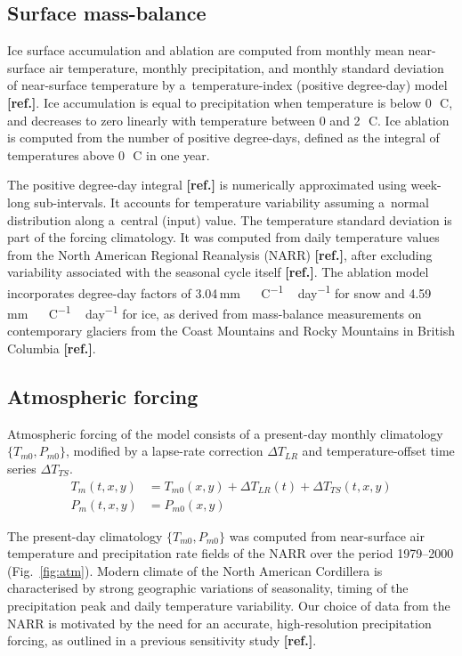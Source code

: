 \documentclass[tc, manuscript]{copernicus}
\newcommand{\aref}[0]{\textbf{[ref.]}}
\renewcommand{\citep}[1]{\aref}
\renewcommand{\citet}[1]{\aref}
\begin{document}
\subsection{Surface mass-balance}

Ice surface accumulation and ablation are computed from monthly mean
near-surface air temperature, monthly precipitation, and monthly standard
deviation of near-surface temperature by a~temperature-index (positive
degree-day) model \citep{hock-2003}. Ice accumulation is equal to precipitation
when temperature is below 0\,\unit{{\degree}C}, and decreases to zero linearly
with temperature between 0 and 2\,\unit{{\degree}C}. Ice ablation is computed
from the number of positive degree-days, defined as the integral of
temperatures above 0\,\unit{{\degree}C} in one year.

The positive degree-day integral \citep{calov-greve-2005} is numerically
approximated using week-long sub-intervals. It accounts for temperature
variability assuming a~normal distribution along a~central (input) value. The
temperature standard deviation is part of the forcing climatology. It was
computed from daily temperature values from the North American Regional
Reanalysis (NARR) \citep{data:narr}, after excluding variability associated
with the
seasonal cycle itself \citet{seguinot-rogozhina-2014}. The
ablation model incorporates degree-day factors of
3.04\,\unit{mm\,{\degree}C^{-1}\,day^{-1}} for snow and
4.59\,\unit{mm\,{\degree}C^{-1}\,day^{-1}} for ice, as derived from
mass-balance measurements on contemporary glaciers from the Coast Mountains and
Rocky Mountains in British Columbia \citep{shea-etal-2009}.

\subsection{Atmospheric forcing}

Atmospheric forcing of the model consists of a present-day monthly climatology
$\{T_{m0}, P_{m0}\}$, modified by a lapse-rate correction ${\Delta}T_{LR}$ and
temperature-offset time series ${\Delta}T_{TS}$.
\begin{align}
    T_m(t, x, y) &= T_{m0}(x, y) + {\Delta}T_{LR}(t) + {\Delta}T_{TS}(t, x, y) \\
    P_m(t, x, y) &= P_{m0}(x, y)
\end{align}

The present-day climatology $\{T_{m0}, P_{m0}\}$ was computed from
near-surface air temperature and precipitation rate fields of the NARR over
the period 1979--2000 (Fig.~\ref{fig:atm}). Modern climate of the North
American Cordillera is characterised by strong geographic variations of
seasonality, timing of the precipitation peak and daily temperature variability.
Our choice of data from the NARR is motivated by the need for an accurate,
high-resolution precipitation forcing, as outlined in a previous sensitivity
study \aref.
\end{document}
